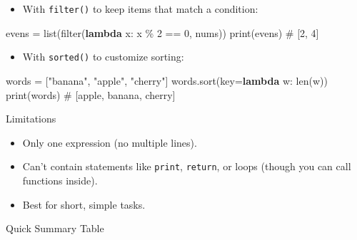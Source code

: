 \documentclass[
  letterpaper,
  DIV=11,
  numbers=noendperiod]{scrreprt}
\newenvironment{Shaded}{\begin{snugshade}}{\end{snugshade}}
\newcommand{\BuiltInTok}[1]{\textcolor[rgb]{0.00,0.23,0.31}{#1}}
\newcommand{\CommentTok}[1]{\textcolor[rgb]{0.37,0.37,0.37}{#1}}
\newcommand{\DecValTok}[1]{\textcolor[rgb]{0.68,0.00,0.00}{#1}}
\newcommand{\KeywordTok}[1]{\textcolor[rgb]{0.00,0.23,0.31}{\textbf{#1}}}
\newcommand{\NormalTok}[1]{\textcolor[rgb]{0.00,0.23,0.31}{#1}}
\newcommand{\OperatorTok}[1]{\textcolor[rgb]{0.37,0.37,0.37}{#1}}
\newcommand{\StringTok}[1]{\textcolor[rgb]{0.13,0.47,0.30}{#1}}
\providecommand{\tightlist}{%
  \setlength{\itemsep}{0pt}\setlength{\parskip}{0pt}}
\begin{document}
\begin{itemize}
\tightlist
\item
  With \texttt{filter()} to keep items that match a condition:
\end{itemize}

\begin{Shaded}
\begin{Highlighting}[]
\NormalTok{evens }\OperatorTok{=} \BuiltInTok{list}\NormalTok{(}\BuiltInTok{filter}\NormalTok{(}\KeywordTok{lambda}\NormalTok{ x: x }\OperatorTok{\%} \DecValTok{2} \OperatorTok{==} \DecValTok{0}\NormalTok{, nums))}
\BuiltInTok{print}\NormalTok{(evens)   }\CommentTok{\# [2, 4]}
\end{Highlighting}
\end{Shaded}

\begin{itemize}
\tightlist
\item
  With \texttt{sorted()} to customize sorting:
\end{itemize}

\begin{Shaded}
\begin{Highlighting}[]
\NormalTok{words }\OperatorTok{=}\NormalTok{ [}\StringTok{"banana"}\NormalTok{, }\StringTok{"apple"}\NormalTok{, }\StringTok{"cherry"}\NormalTok{]}
\NormalTok{words.sort(key}\OperatorTok{=}\KeywordTok{lambda}\NormalTok{ w: }\BuiltInTok{len}\NormalTok{(w))}
\BuiltInTok{print}\NormalTok{(words)   }\CommentTok{\# [\textquotesingle{}apple\textquotesingle{}, \textquotesingle{}banana\textquotesingle{}, \textquotesingle{}cherry\textquotesingle{}]}
\end{Highlighting}
\end{Shaded}

Limitations

\begin{itemize}
\tightlist
\item
  Only one expression (no multiple lines).
\item
  Can't contain statements like \texttt{print}, \texttt{return}, or
  loops (though you can call functions inside).
\item
  Best for short, simple tasks.
\end{itemize}

Quick Summary Table
\end{document}
